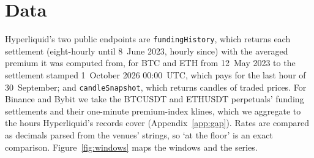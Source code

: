 \documentclass[10pt,a4paper]{article}
\begin{document}
\begin{table}[tbp]
  \centering
  \caption{How the three venues build the premium that enters the common rule~\eqref{eq:rule}, BTC and ETH perpetuals, from their documentation \citep{hyperliquid_funding_docs,hyperliquid_oracle_docs,hyperliquid_contract_docs,binance_funding_docs,bybit_funding_docs,bybit_index_docs} and public APIs as retrieved on 8~October 2026; notes a and c record what the published settlements add. IMR and MMR: initial and maintenance margin rates.}
  \label{tab:construction}
  \footnotesize
  \setlength{\tabcolsep}{4pt}
  
\end{table}

\section{Data}\label{sec:data}

\begin{sloppypar}\noindent Hyperliquid's two public endpoints are \texttt{fundingHistory}, which returns each settlement (eight-hourly until 8~June 2023, hourly since) with the averaged premium it was computed from, for BTC and ETH from 12~May 2023 to the settlement stamped 1~October 2026 00:00~UTC, which pays for the last hour of 30~September; and \texttt{candleSnapshot}, which returns candles of traded prices. For Binance and Bybit we take the BTCUSDT and ETHUSDT perpetuals' funding settlements and their one-minute premium-index klines, which we aggregate to the hours Hyperliquid's records cover (Appendix~\ref{app:gap}). Rates are compared as decimals parsed from the venues' strings, so `at the floor' is an exact comparison. Figure~\ref{fig:windows} maps the windows and the series.\end{sloppypar}
\end{document}
